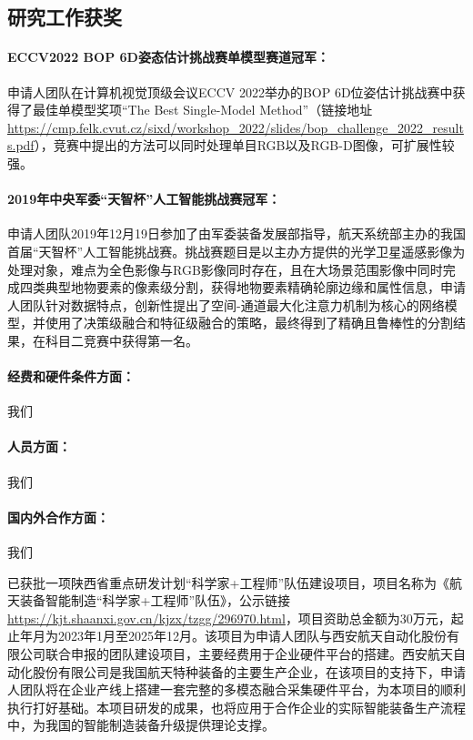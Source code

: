 \documentclass[12pt]{article}
\newcommand{\myPara}[1]{\paragraph{#1：}}
\begin{document}
\subsection{研究工作获奖}

\myPara{ECCV2022 BOP 6D姿态估计挑战赛单模型赛道冠军}
申请人团队在计算机视觉顶级会议ECCV 2022举办的BOP 6D位姿估计挑战赛中获得了最佳单模型奖项“The Best Single-Model Method”（链接地址\url{https://cmp.felk.cvut.cz/sixd/workshop_2022/slides/bop_challenge_2022_results.pdf}），竞赛中提出的方法可以同时处理单目RGB以及RGB-D图像，可扩展性较强。

\myPara{2019年中央军委“天智杯”人工智能挑战赛冠军}
申请人团队2019年12月19日参加了由军委装备发展部指导，航天系统部主办的我国首届“天智杯”人工智能挑战赛。挑战赛题目是以主办方提供的光学卫星遥感影像为处理对象，难点为全色影像与RGB影像同时存在，且在大场景范围影像中同时完成四类典型地物要素的像素级分割，获得地物要素精确轮廓边缘和属性信息，申请人团队针对数据特点，创新性提出了空间-通道最大化注意力机制为核心的网络模型，并使用了决策级融合和特征级融合的策略，最终得到了精确且鲁棒性的分割结果，在科目二竞赛中获得第一名。



\myPara{经费和硬件条件方面}我们


\myPara{人员方面}我们

\myPara{国内外合作方面} 我们



已获批一项陕西省重点研发计划“科学家+工程师”队伍建设项目，项目名称为《航天装备智能制造“科学家+工程师”队伍》，公示链接\url{https://kjt.shaanxi.gov.cn/kjzx/tzgg/296970.html}，项目资助总金额为30万元，起止年月为2023年1月至2025年12月。该项目为申请人团队与西安航天自动化股份有限公司联合申报的团队建设项目，主要经费用于企业硬件平台的搭建。西安航天自动化股份有限公司是我国航天特种装备的主要生产企业，在该项目的支持下，申请人团队将在企业产线上搭建一套完整的多模态融合采集硬件平台，为本项目的顺利执行打好基础。本项目研发的成果，也将应用于合作企业的实际智能装备生产流程中，为我国的智能制造装备升级提供理论支撑。


\end{document}
